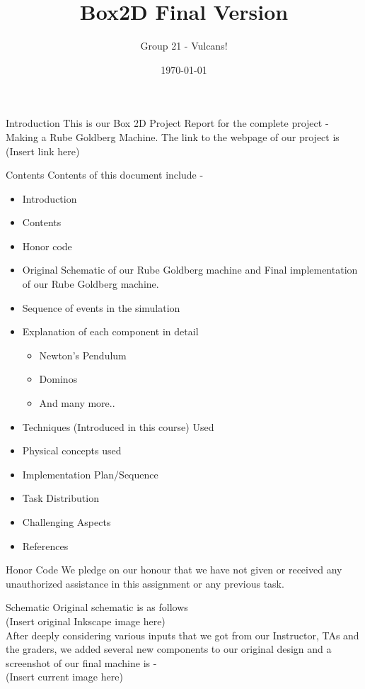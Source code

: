 \documentclass[a4paper,12pt]{article}
\begin{document}
\title{Box2D Final Version}
\author{Group 21 - Vulcans!}
\date{\today}
\maketitle
\begin{section}{Introduction}
This is our Box 2D Project Report for the complete project - Making a Rube Goldberg Machine. 
The link to the webpage of our project is (Insert link here)
\end{section}
\bigskip

\begin{section}{Contents}
Contents of this document include -
\begin{itemize}
\item
Introduction
\item
Contents
\item
Honor code
\item
Original Schematic of our Rube Goldberg machine and Final implementation of our Rube Goldberg machine.
\item
Sequence of events in the simulation
\item
Explanation of each component in detail
\begin{itemize}
\item
Newton's Pendulum
\item
Dominos
\item
And many more..
\end{itemize}
\item
Techniques (Introduced in this course) Used
\item
Physical concepts used
\item
Implementation Plan/Sequence
\item
Task Distribution
\item
Challenging Aspects
\item
References
\end{itemize}
\end{section}
\bigskip

\begin{section}{Honor Code}
We pledge on our honour that we have not given or received any unauthorized assistance in this assignment or any previous task.
\end{section}
\bigskip

\begin{section}{Schematic}
Original schematic is as follows \\
(Insert original Inkscape image here)
\\
After deeply considering various inputs that we got from our Instructor, TAs and the graders, we added several new components to our original design and a screenshot of our final machine is - \\
(Insert current image here)
\end{section}
\bigskip
\end{document}
